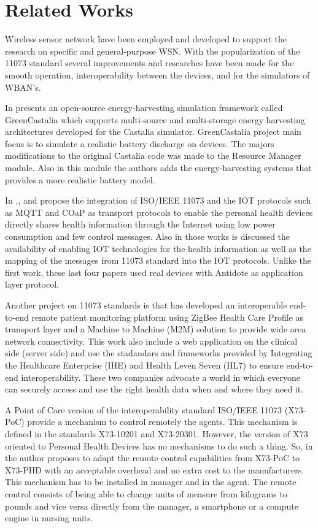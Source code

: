 \section{Related Works}

Wireless sensor network have been employed and developed to support the research on specific and general-purpose WSN. 
With the popularization of the 11073 standard several improvements and researches have been made for the smooth operation, interoperability between the devices, and for the simulators of WBAN's.

In \cite{b6} presents an open-source energy-harvesting simulation framework called GreenCastalia which supports multi-source and multi-storage energy harvesting architectures developed for the Castalia simulator. GreenCastalia project main focus is to simulate a realistic battery discharge on devices. The majors modifications to the original Castalia code was made to the Resource Manager module. Also in this module the authors adds the energy-harvesting systems that provides a more realistic battery model.  

In \cite{b7},\cite{b8},\cite{b9} and \cite{b10}  propose the integration of ISO/IEEE 11073 and the IOT protocols such as MQTT and COaP as transport protocols to enable the personal health devices directly shares health information through the Internet using low power consumption and few control messages. Also in those works is discussed the availability of enabling IOT technologies for the health information as well as the mapping of the messages from 11073 standard into the IOT protocols. Unlike the first work, these last four papers used real devices with Antidote as application layer protocol.

Another project on 11073 standards is \cite{b11} that has developed an interoperable  end-to-end remote patient monitoring platform using ZigBee Health Care Profile as transport layer and a Machine to Machine (M2M) solution to provide wide area network connectivity. This work also include a web application on the clinical side (server side) and use the stadandars and frameworks provided by Integrating the Healthcare Enterprise (IHE) \cite{b13} and Health Leven Seven (HL7) \cite{b12} to ensure end-to-end interoperability. These two companies advocate a world in which everyone can securely access and use the right health data when and where they need it.

A Point of Care version of the interoperability standard ISO/IEEE 11073 (X73-PoC) provide a mechanism to control remotely the agents. This mechanism is defined in the standards X73-10201 and X73-20301. However, the version of X73 oriented to Personal Health Devices has no mechanisms to do such a thing. So, in \cite{b14} the author proposes to adapt the remote control capabilities from X73-PoC to X73-PHD with an acceptable overhead and no extra cost to the manufacturers. This mechanism has to be installed in manager and in the agent. The remote control consists of being able to change units of measure from kilograms to pounds and vice versa directly from the manager, a smartphone or a compute engine
in nursing units.
